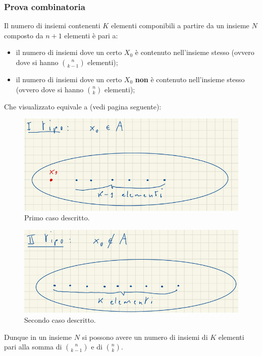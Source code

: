 \documentclass[12pt]{article}
\begin{document}
\subsubsection{Prova combinatoria}
Il numero di insiemi contenenti $K$ elementi componibili a partire da un insieme $N$ composto da $n+1$ elementi è pari a:
\begin{itemize}
        \item il numero di insiemi dove un certo $X_0$ è contenuto nell'insieme stesso (ovvero dove si hanno $\binom{n}{k-1}$ elementi);
    \item il numero di insiemi dove un certo $X_0$ \textbf{non} è contenuto nell'insieme stesso (ovvero dove si hanno $\binom{n}{k}$ elementi);
\end{itemize}
Che visualizzato equivale a (vedi pagina seguente):
\begin{figure}[!htb]
    \centering
    \includegraphics[width=.9\linewidth,height=.40\textheight,keepaspectratio]{prova_combinatoria_1.png} %
    \begin{center}
        \caption{\label{fig:prova_combinatoria_primo_caso}Primo caso descritto.} %
    \end{center}
\end{figure}
\begin{figure}[!htb]
    \centering
    \includegraphics[width=.9\linewidth,height=.40\textheight,keepaspectratio]{prova_combinatoria_2.png} %
    \begin{center}
        \caption{\label{fig:prova_combinatoria_secondo_caso}Secondo caso descritto.} %
    \end{center}
\end{figure} %
Dunque in un insieme $N$ si possono avere un numero di insiemi di $K$ elementi pari alla somma di $\binom{n}{k-1}$ e di $\binom{n}{k}$.
\pagebreak
\end{document}
